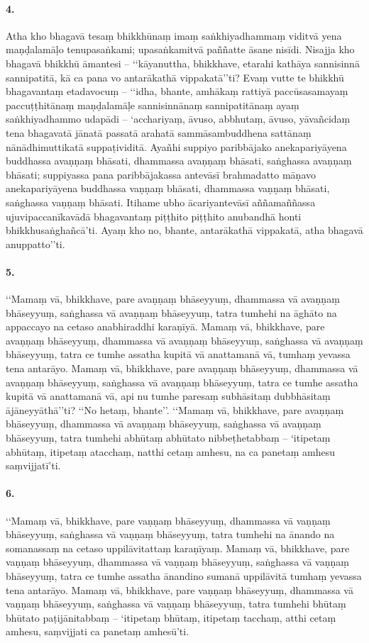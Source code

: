 \paragraph{4.}
Atha kho bhagavā tesaṃ bhikkhūnaṃ imaṃ saṅkhiyadhammaṃ viditvā yena maṇḍalamāḷo tenupasaṅkami; upasaṅkamitvā paññatte āsane nisīdi. Nisajja kho bhagavā bhikkhū āmantesi – ‘‘kāyanuttha, bhikkhave, etarahi kathāya sannisinnā sannipatitā, kā ca pana vo antarākathā vippakatā’’ti? Evaṃ vutte te bhikkhū bhagavantaṃ etadavocuṃ – ‘‘idha, bhante, amhākaṃ rattiyā paccūsasamayaṃ paccuṭṭhitānaṃ maṇḍalamāḷe sannisinnānaṃ sannipatitānaṃ ayaṃ saṅkhiyadhammo udapādi – ‘acchariyaṃ, āvuso, abbhutaṃ, āvuso, yāvañcidaṃ tena bhagavatā jānatā passatā arahatā sammāsambuddhena sattānaṃ nānādhimuttikatā suppaṭividitā. Ayañhi suppiyo paribbājako anekapariyāyena buddhassa avaṇṇaṃ bhāsati, dhammassa avaṇṇaṃ bhāsati, saṅghassa avaṇṇaṃ bhāsati; suppiyassa pana paribbājakassa antevāsī brahmadatto māṇavo anekapariyāyena buddhassa vaṇṇaṃ bhāsati, dhammassa vaṇṇaṃ bhāsati, saṅghassa vaṇṇaṃ bhāsati. Itihame ubho ācariyantevāsī aññamaññassa ujuvipaccanīkavādā bhagavantaṃ piṭṭhito piṭṭhito anubandhā honti bhikkhusaṅghañcā’ti. Ayaṃ kho no, bhante, antarākathā vippakatā, atha bhagavā anuppatto’’ti.

\paragraph{5.}
‘‘Mamaṃ vā, bhikkhave, pare avaṇṇaṃ bhāseyyuṃ, dhammassa vā avaṇṇaṃ bhāseyyuṃ, saṅghassa vā avaṇṇaṃ bhāseyyuṃ, tatra tumhehi na āghāto na appaccayo na cetaso anabhiraddhi karaṇīyā. Mamaṃ vā, bhikkhave, pare avaṇṇaṃ bhāseyyuṃ, dhammassa vā avaṇṇaṃ bhāseyyuṃ, saṅghassa vā avaṇṇaṃ bhāseyyuṃ, tatra ce tumhe assatha kupitā vā anattamanā vā, tumhaṃ yevassa tena antarāyo. Mamaṃ vā, bhikkhave, pare avaṇṇaṃ bhāseyyuṃ, dhammassa vā avaṇṇaṃ bhāseyyuṃ, saṅghassa vā avaṇṇaṃ bhāseyyuṃ, tatra ce tumhe assatha kupitā vā anattamanā vā, api nu tumhe paresaṃ subhāsitaṃ dubbhāsitaṃ ājāneyyāthā’’ti? ‘‘No hetaṃ, bhante’’. ‘‘Mamaṃ vā, bhikkhave, pare avaṇṇaṃ bhāseyyuṃ, dhammassa vā avaṇṇaṃ bhāseyyuṃ, saṅghassa vā avaṇṇaṃ bhāseyyuṃ, tatra tumhehi abhūtaṃ abhūtato nibbeṭhetabbaṃ – ‘itipetaṃ abhūtaṃ, itipetaṃ atacchaṃ, natthi cetaṃ amhesu, na ca panetaṃ amhesu saṃvijjatī’ti.

\paragraph{6.}
‘‘Mamaṃ vā, bhikkhave, pare vaṇṇaṃ bhāseyyuṃ, dhammassa vā vaṇṇaṃ bhāseyyuṃ, saṅghassa vā vaṇṇaṃ bhāseyyuṃ, tatra tumhehi na ānando na somanassaṃ na cetaso uppilāvitattaṃ karaṇīyaṃ. Mamaṃ vā, bhikkhave, pare vaṇṇaṃ bhāseyyuṃ, dhammassa vā vaṇṇaṃ bhāseyyuṃ, saṅghassa vā vaṇṇaṃ bhāseyyuṃ, tatra ce tumhe assatha ānandino sumanā uppilāvitā tumhaṃ yevassa tena antarāyo. Mamaṃ vā, bhikkhave, pare vaṇṇaṃ bhāseyyuṃ, dhammassa vā vaṇṇaṃ bhāseyyuṃ, saṅghassa vā vaṇṇaṃ bhāseyyuṃ, tatra tumhehi bhūtaṃ bhūtato paṭijānitabbaṃ – ‘itipetaṃ bhūtaṃ, itipetaṃ tacchaṃ, atthi cetaṃ amhesu, saṃvijjati ca panetaṃ amhesū’ti.

